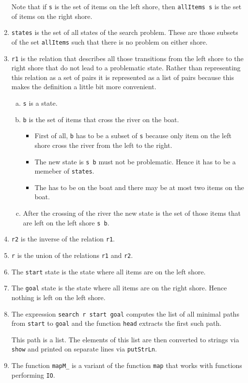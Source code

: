 \begin{enumerate}
            Note that if \texttt{s} is the set of items on the left shore, then
            \texttt{allItems  s} is the set of items on the right shore.
      \item \texttt{states} is the set of all states of the search problem.   These are those subsets of the
            set \texttt{allItems} such that there is no problem on either shore.
      \item \texttt{r1} is the relation that describes all those transitions from the left shore to the right
            shore that do not lead to a problematic state.  Rather than representing this relation as a set of
            pairs it is represented as a list of pairs because this makes the definition a little bit more convenient.
            \begin{enumerate}[(a)]
            \item \texttt{s} is a state.
            \item \texttt{b} is the set of items that cross the river on the boat.
                  \begin{itemize}
                  \item First of all, \texttt{b} has to be a subset of \texttt{s} because only item on the left
                        shore cross the river from the left to the right.
                  \item The new state is \texttt{s  b} must not be problematic.
                        Hence it has to be a memeber of \texttt{states}.
                  \item The  has to be on the boat and there may be at most two items on the boat.
                  \end{itemize}
            \item After the crossing of the river the new state is the set of those items that are left on the
                  left shore \texttt{s  b}.
            \end{enumerate}
      \item \texttt{r2} is the inverse of the relation \texttt{r1}.
      \item \texttt{r} is the union of the relations \texttt{r1} and \texttt{r2}.
      \item The \texttt{start} state is the state where all items are on the left shore.
      \item The \texttt{goal} state is the state where all items are on the right shore.  Hence nothing is left
            on the left shore.
      \item The expression \texttt{search r start goal} computes the list of all minimal paths from \texttt{start} to
            \texttt{goal} and the function \texttt{head} extracts the first such path.

            This path is a list. The elements of this list are then converted to strings via \texttt{show} and
            printed on separate lines via \texttt{putStrLn}.
      \item The function \texttt{mapM\_} is a variant of the function \texttt{map} that works with functions
            performing \texttt{IO}.
 \end{enumerate}


